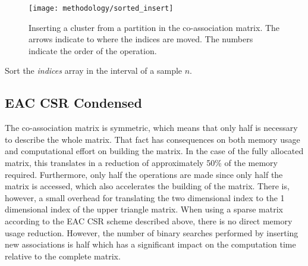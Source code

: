 
\begin{figure}[hbtp]
\centering
\texttt{[image: methodology/sorted\_insert]}
\caption{Inserting a cluster from a partition in the co-association matrix. The arrows indicate to where the indices are moved. The numbers indicate the order of the operation.}
\label{fig:normal part}
\end{figure}



\begin{algorithm}
\caption{Sort the \emph{indices} array in the interval of a sample $n$.}\label{alg:eac csr sort cluster}
\begin{algorithmic}[1]

    \EndWhile
\EndWhile

\EndProcedure
\end{algorithmic}
\end{algorithm}

\subsection{EAC CSR Condensed}

The co-association matrix is symmetric, which means that only half is necessary to describe the whole matrix.
That fact has consequences on both memory usage and computational effort on building the matrix.
In the case of the fully allocated matrix, this translates in a reduction of approximately 50\% of the memory required.
Furthermore, only half the operations are made since only half the matrix is accessed, which also accelerates the building of the matrix.
There is, however, a small overhead for translating the two dimensional index to the 1 dimensional index of the upper triangle matrix.
When using a sparse matrix according to the EAC CSR scheme described above, there is no direct memory usage reduction.
However, the number of binary searches performed by inserting new associations is half which has a significant impact on the computation time relative to the complete matrix.

